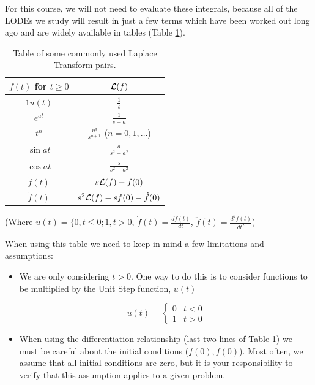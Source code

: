 For this course, we will not need to evaluate these integrals, because all of the LODEs we study will result in just a few terms which have been worked out long ago and are widely available in tables (Table \ref{LaplaceTransformTable}).



\begin{table}\centering
\renewcommand\arraystretch{2.0}%
\begin{tabular}{|c|c|}
\hline
$ f(t)$ { for} $t \geq 0$ &  $\mathcal{L}(f)$\\
\hline
$1u(t)$      & $\displaystyle \frac{1}{s}$\\\hline
$e^{at}$ & $\displaystyle \frac{1}{s-a}$\\ \hline
$t^n$    & $\displaystyle \frac{n!}{s^{n+1}}$ ($n = 0,1, \ldots$)\\ \hline
$\sin at$ & $\displaystyle \frac{a}{s^2 + a^2}$\\ \hline
$\cos at$ & $\displaystyle \frac{s}{s^2 + a^2}$\\ \hline
$\dot{f}(t)$ & $s{\cal L}(f)-f(0)$\\ \hline
$\ddot{f}(t)$ & $s^2{\cal L}(f)-sf(0)-\dot{f}(0)$
\\ \hline
\end{tabular}

(Where
$u(t) = \{ 0, t\le 0; 1, t > 0$,
$\dot{f}(t) = \frac{df(t)}{dt}$, $\ddot{f}(t) = \frac{d^2f(t)}{dt^2}$)
\caption{Table of some commonly used Laplace Transform pairs.}\label{LaplaceTransformTable}
\end{table}


When using this table we need to keep in mind a few limitations and assumptions:

\begin{itemize}
  \item We are only considering $t>0$.   One way to do this is to consider functions to be multiplied by the Unit Step function, $u(t)$

\[
  u(t) = \left \{ \begin{array}{ll}  0 & t < 0 \\ 1 & t > 0 \end{array} \right .
\]

  \item When using the differentiation relationship (last two lines of Table \ref{LaplaceTransformTable}) we must be careful about the initial conditions ($f(0), \dot{f}(0)$).    Most often, we assume that all initial conditions are zero, but it is your responsibility to verify that this assumption applies to a given problem.
\end{itemize}



